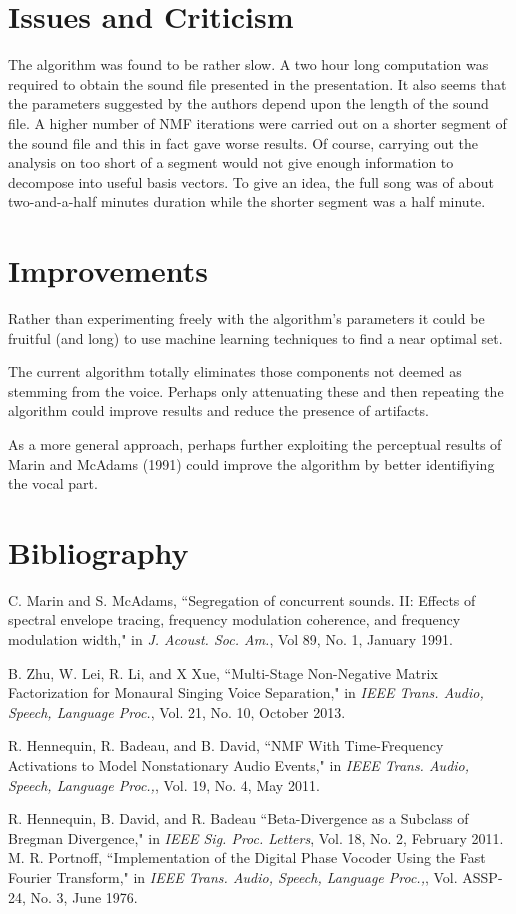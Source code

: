 \documentclass[10pt]{article}
\begin{document}
\section*{Issues and Criticism}
The algorithm was found to be rather slow. A two hour long computation was
required to obtain the sound file presented in the presentation. It also seems
that the parameters suggested by the authors depend upon the length of the sound
file. A higher number of NMF iterations were carried out on a shorter segment of
the sound file and this in fact gave worse results. Of course, carrying out the
analysis on too short of a segment would not give enough information to
decompose into useful basis vectors. To give an idea, the full song was of
about two-and-a-half minutes duration while the shorter segment was a half minute.


\section*{Improvements}
Rather than experimenting freely with the algorithm's parameters it could be
fruitful (and long) to use machine learning techniques to find a near optimal
set.
\par
The current algorithm totally eliminates those components not deemed as stemming
from the voice. Perhaps only attenuating these and then repeating the algorithm
could improve results and reduce the presence of artifacts.
\par
As a more general approach, perhaps further exploiting the perceptual results of
Marin and McAdams (1991) could improve the algorithm by better identifiying the
vocal part.


\section*{Bibliography}
\begin{flushleft}
C. Marin and S. McAdams, ``Segregation of concurrent sounds. II: Effects of
spectral envelope tracing, frequency modulation coherence, and frequency
modulation width," in \textit{J. Acoust. Soc. Am.}, Vol 89, No. 1, January 1991.
\par
B. Zhu, W. Lei, R. Li, and X Xue, ``Multi-Stage Non-Negative Matrix
Factorization for Monaural Singing Voice Separation," in \textit{IEEE Trans.
Audio, Speech, Language Proc.}, Vol. 21, No. 10, October 2013.
\par
R. Hennequin, R. Badeau, and B. David, ``NMF With Time-Frequency Activations to
Model Nonstationary Audio Events," in \textit{IEEE Trans.
Audio, Speech, Language Proc.,}, Vol. 19, No. 4, May 2011.
\par
R. Hennequin, B. David, and R. Badeau ``Beta-Divergence as a Subclass of Bregman
Divergence," in \textit{IEEE Sig. Proc. Letters}, Vol. 18, No. 2, February 2011.
M. R. Portnoff, ``Implementation of the Digital Phase Vocoder Using the Fast
Fourier Transform," in \textit{IEEE Trans.  Audio, Speech, Language Proc.,},
Vol. ASSP-24, No. 3, June 1976.
\end{flushleft}
\end{document}
